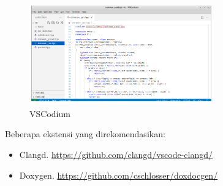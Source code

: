 \documentclass[12pt]{book}
\begin{document}
	\begin{figure}[!ht]
		\centering
		\includegraphics[width=0.7\textwidth]{images/editor/vscodium}
		\caption{VSCodium}
	\end{figure}
	
	Beberapa ekstensi yang direkomendasikan:
	
	\begin{itemize}
		\item Clangd. \url{https://github.com/clangd/vscode-clangd/}
		\item Doxygen. \url{https://github.com/cschlosser/doxdocgen/}
	\end{itemize}
	
	
\end{document}
